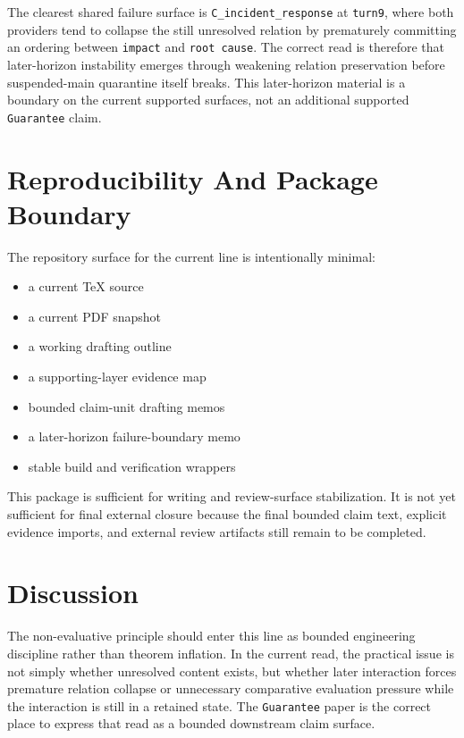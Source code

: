 \documentclass[11pt]{article}
\begin{document}
The clearest shared failure surface is \texttt{C\_incident\_response} at
\texttt{turn9}, where both providers tend to collapse the still unresolved
relation by prematurely committing an ordering between \texttt{impact} and
\texttt{root cause}. The correct read is therefore that later-horizon
instability emerges through weakening relation preservation before
suspended-main quarantine itself breaks. This later-horizon material is a
boundary on the current supported surfaces, not an additional supported
\texttt{Guarantee} claim.

\section{Reproducibility And Package Boundary}

The repository surface for the current line is intentionally minimal:
\begin{itemize}
\item a current TeX source
\item a current PDF snapshot
\item a working drafting outline
\item a supporting-layer evidence map
\item bounded claim-unit drafting memos
\item a later-horizon failure-boundary memo
\item stable build and verification wrappers
\end{itemize}

This package is sufficient for writing and review-surface stabilization. It is not
yet sufficient for final external closure because the final bounded claim text,
explicit evidence imports, and external review artifacts still remain to be
completed.

\section{Discussion}

The non-evaluative principle should enter this line as bounded engineering
discipline rather than theorem inflation. In the current read, the practical issue
is not simply whether unresolved content exists, but whether later interaction
forces premature relation collapse or unnecessary comparative evaluation pressure
while the interaction is still in a retained state. The \texttt{Guarantee} paper is
the correct place to express that read as a bounded downstream claim surface.
\end{document}
